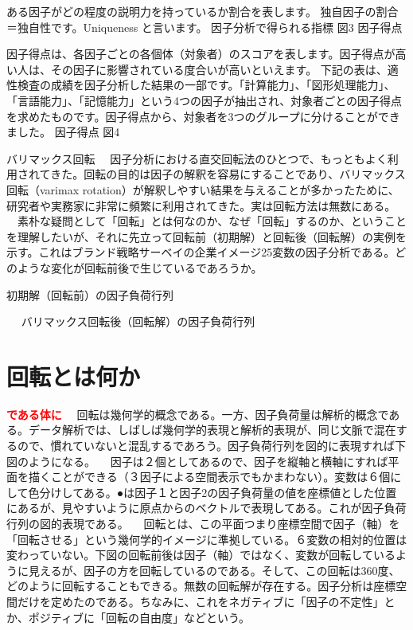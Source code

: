 \documentclass[a4j,11pt,mc]{jreport}
\newcommand{\tr}[1]{\textcolor{red}{\bf#1}} %
\begin{document}
	ある因子がどの程度の説明力を持っているか割合を表します。
	独自因子の割合＝独自性です。Uniqueness と言います。
	因子分析で得られる指標
	図3
	因子得点

	因子得点は、各因子ごとの各個体（対象者）のスコアを表します。因子得点が高い人は、その因子に影響されている度合いが高いといえます。
	下記の表は、適性検査の成績を因子分析した結果の一部です。「計算能力」、「図形処理能力」、「言語能力」、「記憶能力」という4つの因子が抽出され、対象者ごとの因子得点を求めたものです。因子得点から、対象者を3つのグループに分けることができました。
	因子得点
	図4







	バリマックス回転
	　因子分析における直交回転法のひとつで、もっともよく利用されてきた。回転の目的は因子の解釈を容易にすることであり、バリマックス回転（varimax rotation）が解釈しやすい結果を与えることが多かったために、研究者や実務家に非常に頻繁に利用されてきた。実は回転方法は無数にある。
	　素朴な疑問として「回転」とは何なのか、なぜ「回転」するのか、ということを理解したいが、それに先立って回転前（初期解）と回転後（回転解）の実例を示す。これはブランド戦略サーベイの企業イメージ25変数の因子分析である。どのような変化が回転前後で生じているであろうか。

	初期解（回転前）の因子負荷行列　

	　
	バリマックス回転後（回転解）の因子負荷行列


\section{回転とは何か}

\tr{である体に}
	　回転は幾何学的概念である。一方、因子負荷量は解析的概念である。データ解析では、しばしば幾何学的表現と解析的表現が、同じ文脈で混在するので、慣れていないと混乱するであろう。因子負荷行列を図的に表現すれば下図のようになる。
	　因子は２個としてあるので、因子を縦軸と横軸にすれば平面を描くことができる（３因子による空間表示でもかまわない）。変数は６個にして色分けしてある。●は因子１と因子2の因子負荷量の値を座標値とした位置にあるが、見やすいように原点からのベクトルで表現してある。これが因子負荷行列の図的表現である。
	　回転とは、この平面つまり座標空間で因子（軸）を「回転させる」という幾何学的イメージに準拠している。６変数の相対的位置は変わっていない。下図の回転前後は因子（軸）ではなく、変数が回転しているように見えるが、因子の方を回転しているのである。そして、この回転は360度、どのように回転することもできる。無数の回転解が存在する。因子分析は座標空間だけを定めたのである。ちなみに、これをネガティブに「因子の不定性」とか、ポジティブに「回転の自由度」などという。
\end{document}
